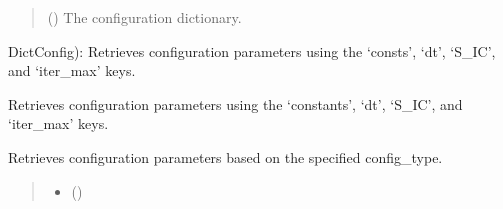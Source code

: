 \documentclass[a4paper,11pt,english,openany]{sphinxmanual}
\begin{document}
\begin{fulllineitems}
\begin{fulllineitems}
\begin{quote}
\begin{description}
\sphinxAtStartPar
{} () \textendash{} The configuration dictionary.

\end{description}\end{quote}


\begin{fulllineitems}

\pysigstartsignatures
\pysigline
{}
\pysigstopsignatures
\sphinxAtStartPar
DictConfig): Retrieves configuration parameters using the ‘consts’, ‘dt’, ‘S\_IC’, and ‘iter\_max’ keys.

\end{fulllineitems}


\begin{fulllineitems}
\label{\detokenize{api/spyice.utils.config_sort:id0}}
\pysigstartsignatures
\pysiglinewithargsret
{}
{}
{}
\pysigstopsignatures
\sphinxAtStartPar
Retrieves configuration parameters using the ‘constants’, ‘dt’, ‘S\_IC’, and ‘iter\_max’ keys.

\end{fulllineitems}


\begin{fulllineitems}
\label{\detokenize{api/spyice.utils.config_sort:id1}}
\pysigstartsignatures
\pysiglinewithargsret
{}
{\sphinxparamcomma {}}
{}
\pysigstopsignatures
\sphinxAtStartPar
Retrieves configuration parameters based on the specified config\_type.
\begin{quote}\begin{description}
\begin{itemize}
\item {} 
\sphinxAtStartPar
{} ()


\end{itemize}
\end{description}
\end{quote}
\end{fulllineitems}
\end{fulllineitems}
\end{fulllineitems}
\end{document}

